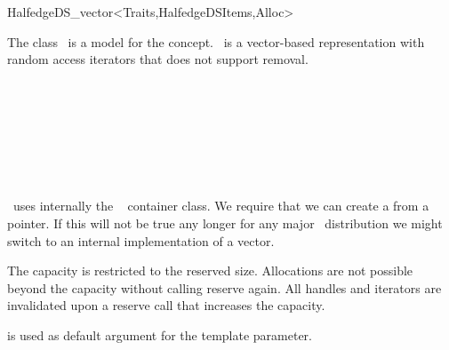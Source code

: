 
\ccRefPageBegin



\begin{ccRefClass}{HalfedgeDS_vector<Traits,HalfedgeDSItems,Alloc>}

\ccDefinition
  
The class \ccRefName\ is a model for the  concept.
\ccRefName\ is a vector-based representation with random
access iterators that does not support removal.


\ccIsModel


\ccTypes
{}

\ccGlue
{}

\ccSeeAlso

\\
\\
\\
\\
\\
\\


\ccImplementation

\ccRefName\ uses internally the \stl\  container
class. We require that we can create a 
from a pointer. If this will not be true any longer for any major \stl\
distribution we might switch to an internal implementation of a vector.

The capacity is restricted to the reserved size. Allocations
are not possible beyond the capacity without calling reserve again.
All handles and iterators are invalidated upon a reserve call that
increases the capacity.

 is used as default argument for the
 template parameter.  

\end{ccRefClass}

\ccRefPageEnd

